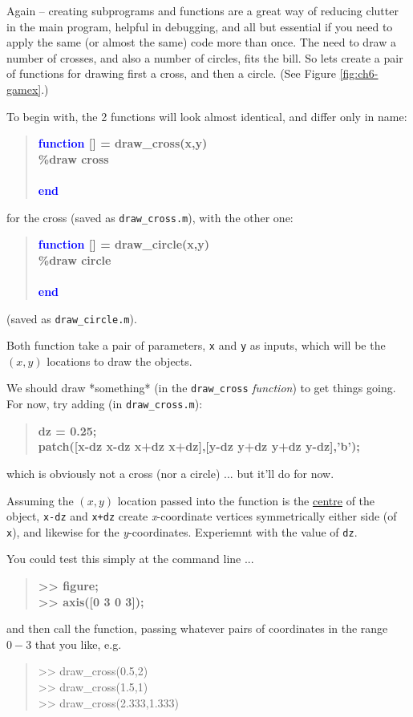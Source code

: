 \documentclass{tufte-book} %
\newenvironment{docspec}{\begin{quotation}\ttfamily\parskip0pt\parindent0pt\ignorespaces}{\end{quotation}}
\newenvironment{docspecbold}{\begin{quotation}\ttfamily\bfseries\parskip0pt\parindent0pt\ignorespaces}{\end{quotation}}
\begin{document}
Again -- creating subprograms and functions are a great way of reducing clutter in the main program, helpful in debugging, and all but essential if you need to apply the same (or almost the same) code more than once. The need to draw a number of crosses, and also a number of circles, fits the bill. So lets create a pair of functions for drawing first a cross, and then a circle. (See Figure \ref{fig:ch6-gamex}.)

To begin with, the 2 functions will look almost identical, and differ only in name:
\begin{docspecbold}
\textcolor{blue}{function} [] = draw\_cross(x,y)\\
\textcolor[rgb]{0,0.501961,0}{\%draw cross\\}
\ \\
\textcolor{blue}{end}
\end{docspecbold}
for the cross (saved as \texttt{draw\_cross.m}), with the other one:

\vspace{-2mm}\begin{docspecbold}
\textcolor{blue}{function} [] = draw\_circle(x,y)\\
\textcolor[rgb]{0,0.501961,0}{\%draw circle\\}
\ \\
\textcolor{blue}{end}
\end{docspecbold}\vspace{-2mm}
(saved as \texttt{draw\_circle.m}).

Both function take a pair of parameters, \texttt{x} and \texttt{y} as inputs, which will be the \((x,y)\) locations to draw the objects.

We should draw *something* (in the \texttt{draw\_cross}  \textit{function}) to get things going. For now, try adding (in \texttt{draw\_cross.m}):
\begin{docspecbold}
dz = 0.25;\\
patch([x-dz x-dz x+dz x+dz],[y-dz y+dz y+dz y-dz],'b');
\end{docspecbold}
which is obviously not a cross (nor a circle) ... but it'll do for now.

Assuming the \((x,y)\) location passed into the function is the \uline{centre} of the object, \texttt{x-dz} and \texttt{x+dz} create \textit{x}-coordinate vertices symmetrically either side (of \texttt{x}), and likewise for the \textit{y}-coordinates. Experiemnt with the value of \texttt{dz}.

You could test this simply at the command line ...
\begin{docspecbold}
>> figure;\\
>> axis([0 3 0 3]);
\end{docspecbold}
and then call the function, passing whatever pairs of coordinates in the range \(0-3\) that you like, e.g.
\begin{docspec}
>> draw\_cross(0.5,2)\\
>> draw\_cross(1.5,1)\\
>> draw\_cross(2.333,1.333)
\end{docspec}
\end{document}
